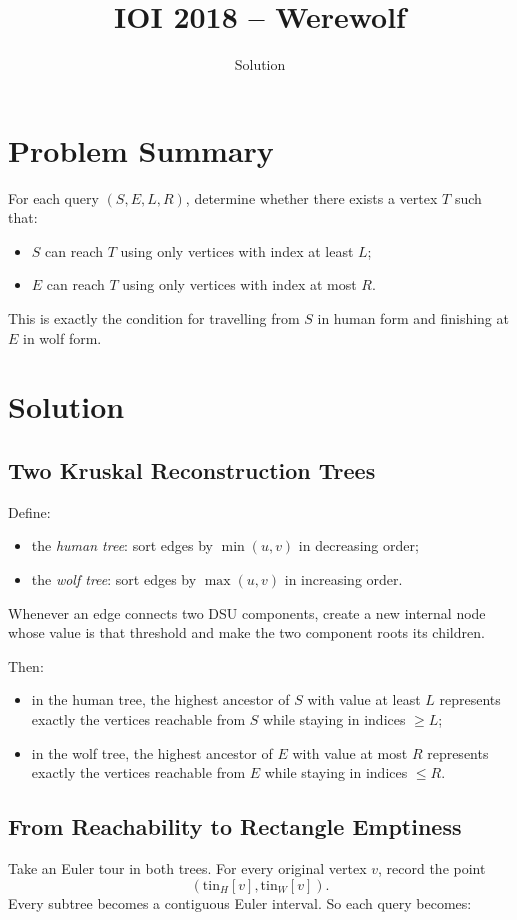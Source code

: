 \documentclass[11pt,a4paper]{article}
\title{IOI 2018 -- Werewolf}
\author{Solution}
\date{}
\begin{document}
\maketitle

\section{Problem Summary}
For each query $(S,E,L,R)$, determine whether there exists a vertex $T$ such that:
\begin{itemize}
  \item $S$ can reach $T$ using only vertices with index at least $L$;
  \item $E$ can reach $T$ using only vertices with index at most $R$.
\end{itemize}
This is exactly the condition for travelling from $S$ in human form and finishing at $E$ in wolf form.

\section{Solution}

\subsection{Two Kruskal Reconstruction Trees}
Define:
\begin{itemize}
  \item the \emph{human tree}: sort edges by $\min(u,v)$ in decreasing order;
  \item the \emph{wolf tree}: sort edges by $\max(u,v)$ in increasing order.
\end{itemize}

Whenever an edge connects two DSU components, create a new internal node whose value is that threshold and make the two component roots its children.

Then:
\begin{itemize}
  \item in the human tree, the highest ancestor of $S$ with value at least $L$ represents exactly the vertices reachable from $S$ while staying in indices $\ge L$;
  \item in the wolf tree, the highest ancestor of $E$ with value at most $R$ represents exactly the vertices reachable from $E$ while staying in indices $\le R$.
\end{itemize}

\subsection{From Reachability to Rectangle Emptiness}
Take an Euler tour in both trees. For every original vertex $v$, record the point
\[
(\mathrm{tin}_H[v], \mathrm{tin}_W[v]).
\]
Every subtree becomes a contiguous Euler interval. So each query becomes:
\end{document}
